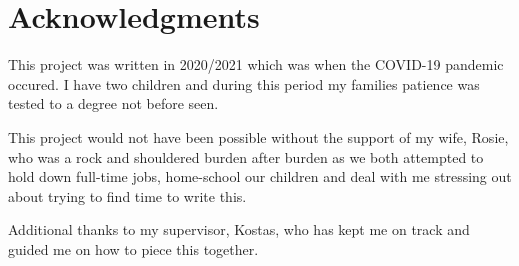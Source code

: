 \newpage
\vspace*{\fill}
\section*{Acknowledgments}

This project was written in 2020/2021 which was when the COVID-19 pandemic occured. I have two children and
during this period my families patience was tested to a degree not before seen.

This project would not have been possible without the support of my wife, Rosie, who was a rock and shouldered
burden after burden as we both attempted to hold down full-time jobs, home-school our children and deal with
me stressing out about trying to find time to write this.

Additional thanks to my supervisor, Kostas, who has kept me on track and guided me on how to piece this together.

\vspace*{\fill}

